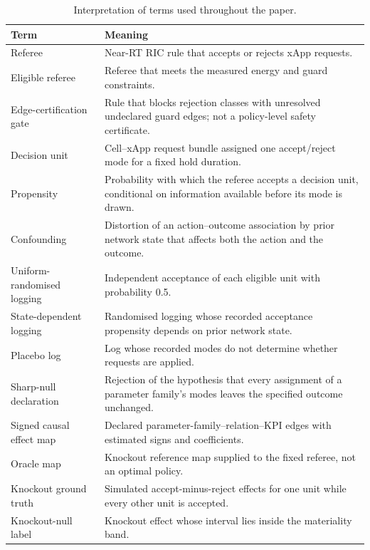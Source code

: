 \begin{table}[tbp]
\caption{Interpretation of terms used throughout the paper.}
\label{tab:terms}
\footnotesize
\setlength{\tabcolsep}{3pt}
\begin{tabular*}{\textwidth}{@{\extracolsep\fill}>{\raggedright}p{}>{\raggedright\arraybackslash}p{}@{}}
\toprule
Term & Meaning \\
\midrule
Referee & Near-RT RIC rule that accepts or rejects xApp requests. \\
Eligible referee & Referee that meets the measured energy and guard constraints. \\
Edge-certification gate & Rule that blocks rejection classes with unresolved undeclared guard edges; not a policy-level
safety certificate. \\
Decision unit & Cell--xApp request bundle assigned one accept/reject mode for a fixed hold duration. \\
Propensity & Probability with which the referee accepts a decision unit, conditional on information available before
its mode is drawn. \\
Confounding & Distortion of an action--outcome association by prior network state that affects both the action and the
outcome. \\
Uniform-randomised logging & Independent acceptance of each eligible unit with probability 0.5. \\
State-dependent logging & Randomised logging whose recorded acceptance propensity depends on prior network state. \\
Placebo log & Log whose recorded modes do not determine whether requests are applied. \\
Sharp-null declaration & Rejection of the hypothesis that every assignment of a parameter family's modes leaves the
specified outcome unchanged. \\
Signed causal effect map & Declared parameter-family--relation--KPI edges with estimated signs and coefficients. \\
Oracle map & Knockout reference map supplied to the fixed referee, not an optimal policy. \\
Knockout ground truth & Simulated accept-minus-reject effects for one unit while every other unit is accepted. \\
Knockout-null label & Knockout effect whose interval lies inside the materiality band. \\
\bottomrule
\end{tabular*}
\end{table}
\FloatBarrier
